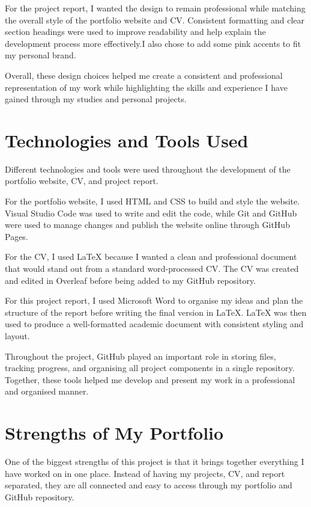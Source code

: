 \documentclass[12pt,a4paper]{article}
\begin{document}
For the project report, I wanted the design to remain professional while matching the overall style of the portfolio website and CV. Consistent formatting and clear section headings were used to improve readability and help explain the development process more effectively.I also chose to add some pink accents to fit my personal brand.

Overall, these design choices helped me create a consistent and professional representation of my work while highlighting the skills and experience I have gained through my studies and personal projects.

\section{Technologies and Tools Used}

Different technologies and tools were used throughout the development of the portfolio website, CV, and project report.

For the portfolio website, I used HTML and CSS to build and style the website. Visual Studio Code was used to write and edit the code, while Git and GitHub were used to manage changes and publish the website online through GitHub Pages.

For the CV, I used LaTeX because I wanted a clean and professional document that would stand out from a standard word-processed CV. The CV was created and edited in Overleaf before being added to my GitHub repository.

For this project report, I used Microsoft Word to organise my ideas and plan the structure of the report before writing the final version in LaTeX. LaTeX was then used to produce a well-formatted academic document with consistent styling and layout.

Throughout the project, GitHub played an important role in storing files, tracking progress, and organising all project components in a single repository. Together, these tools helped me develop and present my work in a professional and organised manner.

\section{Strengths of My Portfolio}

One of the biggest strengths of this project is that it brings together everything I have worked on in one place. Instead of having my projects, CV, and report separated, they are all connected and easy to access through my portfolio and GitHub repository.
\end{document}
